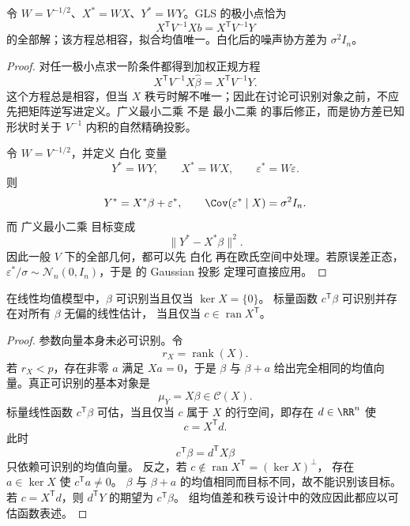 \begin{proposition}[白化与正规方程]

令 $W=V^{-1/2}$、$X^*=WX$、$Y^*=WY$。GLS 的极小点恰为
\[
 X^{\mathsf T}V^{-1}Xb=X^{\mathsf T}V^{-1}Y
\]
的全部解；该方程总相容，拟合均值唯一。白化后的噪声协方差为 $\sigma^2I_n$。

\end{proposition}
\begin{proof}
对任一极小点求一阶条件都得到加权正规方程
\begin{equation*}X^{\mathsf T}V^{-1}X\widehat\beta
 =X^{\mathsf T}V^{-1}Y.
\end{equation*}
这个方程总是相容，但当 $X$ 秩亏时解不唯一；因此在讨论可识别对象之前，不应先把矩阵逆写进定义。广义最小二乘 不是 最小二乘 的事后修正，而是协方差已知形状时关于 $V^{-1}$ 内积的自然精确投影。

令 $W=V^{-1/2}$，并定义 白化 变量
\[
 Y^*=WY,
 \qquad
 X^*=WX,
 \qquad
 \varepsilon^*=W\varepsilon.
\]
则
\[
 Y^*=X^*\beta+\varepsilon^*,
 \qquad
 \Cov(\varepsilon^*\mid X)=\sigma^2I_n.
\]
而 广义最小二乘 目标变成
\[
 \|Y^*-X^*\beta\|^2.
\]
因此一般 $V$ 下的全部几何，都可以先 白化 再在欧氏空间中处理。若原误差正态，$\varepsilon^*/\sigma\sim\mathcal N_n(0,I_n)$，于是  的 Gaussian 投影 定理可直接应用。
\end{proof}

\begin{proposition}[秩亏设计与可估函数]

\label{prop:math-linear-estimability}
在线性均值模型中，$\beta$ 可识别当且仅当 $\ker X=\{0\}$。
标量函数 $c^{\mathsf T}\beta$ 可识别并存在对所有 $\beta$ 无偏的线性估计，
当且仅当 $c\in\operatorname{ran}X^{\mathsf T}$。

\end{proposition}
\begin{proof}
参数向量本身未必可识别。令
\[
 r_X=\operatorname{rank}(X).
\]
若 $r_X<p$，存在非零 $a$ 满足 $Xa=0$，于是 $\beta$ 与 $\beta+a$ 给出完全相同的均值向量。真正可识别的基本对象是
\[
 \mu_Y=X\beta\in\mathcal C(X).
\]
标量线性函数 $c^{\mathsf T}\beta$ 可估，当且仅当 $c$ 属于 $X$ 的行空间，即存在 $d\in\RR^n$ 使
\begin{equation*}c=X^{\mathsf T}d.
\end{equation*}
此时
\[
 c^{\mathsf T}\beta=d^{\mathsf T}X\beta
\]
只依赖可识别的均值向量。
反之，若 $c\notin\operatorname{ran}X^{\mathsf T}=(\ker X)^\perp$，
存在 $a\in\ker X$ 使 $c^{\mathsf T}a\ne0$。
$\beta$ 与 $\beta+a$ 的均值相同而目标不同，故不能识别该目标。
若 $c=X^{\mathsf T}d$，则 $d^{\mathsf T}Y$ 的期望为 $c^{\mathsf T}\beta$。
组均值差和秩亏设计中的效应因此都应以可估函数表述。

\end{proof}

